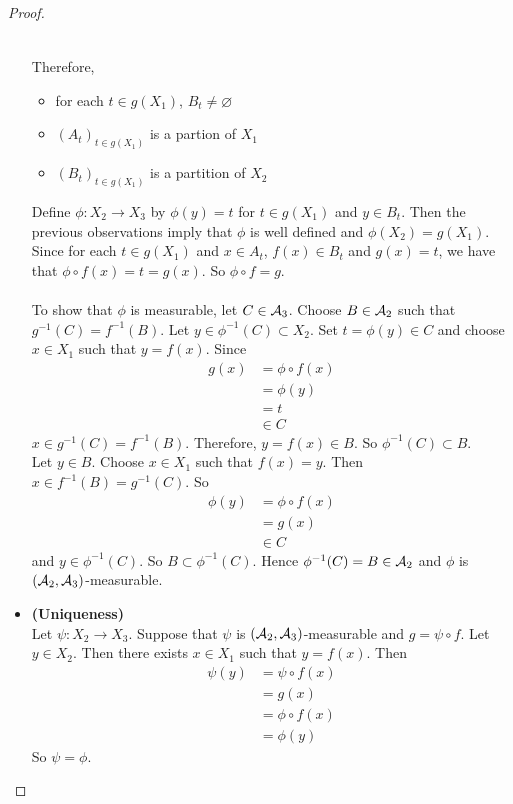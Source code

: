\documentclass{book}
\begin{document}
\begin{proof}
\begin{itemize}
\begin{itemize}
\begin{align*}
				\end{align*}
			\end{itemize}
			Therefore, 
			\begin{itemize}
				\item for each $t \in g(X_1)$, $B_t \neq \varnothing$
				\item $(A_t)_{t \in g(X_1)}$ is a partion of $X_1$
				\item $(B_t)_{t \in g(X_1)}$ is a partition of $X_2$\\
			\end{itemize}		
			Define $\phi:X_2 \rightarrow X_3$ by $\phi(y) = t$ for $t \in g(X_1)$ and $y \in B_t $. Then the previous observations imply that $\phi$ is well defined and $\phi(X_2) = g(X_1)$. Since for each $t \in g(X_1)$ and $x \in A_t$, $f(x) \in B_t$ and $g(x) = t$, we have that $\phi \circ f (x) = t = g(x)$. So $\phi \circ f = g$. \\ \\
			To show that $\phi$ is measurable, let $C \in \mathcal{A}_3$. Choose $B \in \mathcal{A}_2$ such that $g^{-1}(C) = f^{-1}(B)$.
			Let $y \in \phi^{-1}(C) \subset X_2$. Set $t = \phi(y) \in C$ and choose $x \in X_1$ such that $y = f(x)$. Since 
			\begin{align*}
				g(x) 
				&= \phi \circ f (x) \\
				&= \phi(y) \\
				&= t \\
				&\in C
			\end{align*}		
			$x \in g^{-1}(C) = f^{-1}(B)$. Therefore, $y = f(x) \in B$. So $\phi^{-1}(C) \subset B$. \\
			Let $y \in B$. Choose $x \in X_1$ such that $f(x) = y$. Then $x \in f^{-1}(B) = g^{-1}(C)$. So 
			\begin{align*}
				\phi(y) 
				&= \phi \circ f (x) \\
				&= g(x) \\
				&\in C
			\end{align*}	 
			and $y \in \phi^{-1}(C)$. So $B \subset \phi^{-1}(C)$. 
			Hence $\phi^{-1}(C) = B \in \mathcal{A}_2$ and $\phi$ is $(\mathcal{A}_2, \mathcal{A}_3)$-measurable.\\
			\item \textbf{(Uniqueness)} \\
			Let $\psi: X_2 \rightarrow X_3$. Suppose that $\psi$ is $(\mathcal{A}_2, \mathcal{A}_3)$-measurable and $g = \psi \circ f$. Let $y \in X_2$. Then there exists $x \in X_1$ such that $y = f(x)$. Then 
			\begin{align*}
				\psi(y) 
				&= \psi \circ f(x) \\
				&= g(x) \\
				&= \phi \circ f(x) \\
				&= \phi(y)
			\end{align*}
			So $\psi = \phi$.
		\end{itemize}
	\end{proof}
\end{document}
